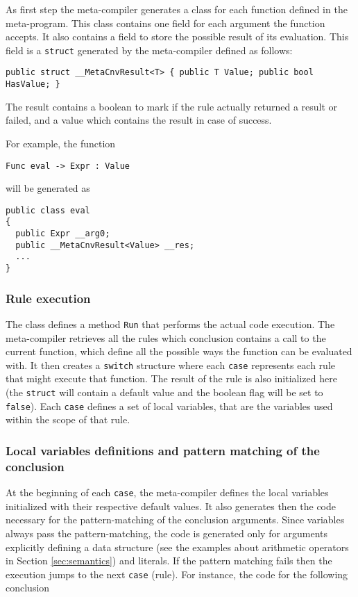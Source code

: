 As first step the meta-compiler generates a class for each function defined in the meta-program. This class contains one field for each argument the function accepts. It also contains a field to store the possible result of its evaluation. This field is a \texttt{struct} generated by the meta-compiler defined as follows:

\begin{lstlisting}
public struct __MetaCnvResult<T> { public T Value; public bool HasValue; }
\end{lstlisting}

The result contains a boolean to mark if the rule actually returned a result or failed, and a value which contains the result in case of success.

For example, the function

\begin{lstlisting}
Func eval -> Expr : Value
\end{lstlisting}

\noindent
will be generated as

\begin{lstlisting}
public class eval
{
  public Expr __arg0;
  public __MetaCnvResult<Value> __res;
  ...
}
\end{lstlisting}

\subsubsection{Rule execution}

The class defines a method \texttt{Run} that performs the actual code execution. The meta-compiler retrieves all the rules which conclusion contains a call to the current function, which define all the possible ways the function can be evaluated with. It then creates a \texttt{switch} structure where each \texttt{case} represents each rule that might execute that function. The result of the rule is also initialized here (the \texttt{struct} will contain a default value and the boolean flag will be set to \texttt{false}). Each \texttt{case} defines a set of local variables, that are the variables used within the scope of that rule.

\subsubsection{Local variables definitions and pattern matching of the conclusion}

At the beginning of each \texttt{case}, the meta-compiler defines the local variables initialized with their respective default values. It also generates then the code necessary for the pattern-matching of the conclusion arguments. Since variables always pass the pattern-matching, the code is generated only for arguments explicitly defining a data structure (see the examples about arithmetic operators in Section \ref{sec:semantics}) and literals. If the pattern matching fails then the execution jumps to the next \texttt{case} (rule). For instance, the code for the following conclusion

